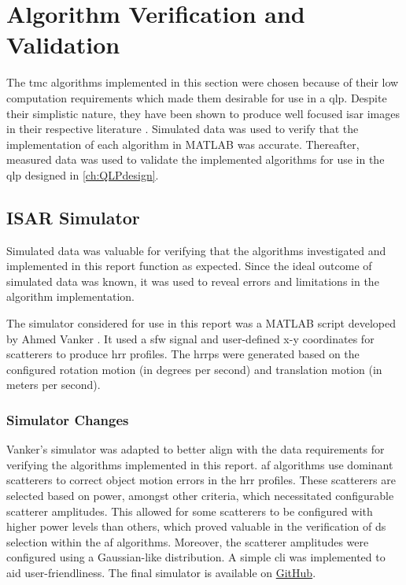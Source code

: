 \documentclass[class=report,11pt,crop=false]{standalone}
\begin{document}
\ifstandalone
\tableofcontents
\fi
\chapter{Algorithm Verification and Validation \label{ch:algorithmV&V}}
The \gls{tmc} algorithms implemented in this section were chosen because of their low computation requirements which made them desirable for use in a \gls{qlp}. Despite their simplistic nature, they have been shown to produce well focused \gls{isar} images in their respective literature \cite{ISARtextbook_Martorella,haywood_RA_AF,yuan_AF}. Simulated data was used to verify that the implementation of each algorithm in \textsc{MATLAB} was accurate. Thereafter, measured data was used to validate the implemented algorithms for use in the \gls{qlp} designed in \autoref{ch:QLPdesign}.
\section{ISAR Simulator}
Simulated data was valuable for verifying that the algorithms investigated and implemented in this report function as expected. Since the ideal outcome of simulated data was known, it was used to reveal errors and limitations in the algorithm implementation. 

The simulator considered for use in this report was a \textsc{MATLAB} script developed by Ahmed Vanker \cite{4022}. It used a \gls{sfw} signal and user-defined x-y coordinates for scatterers to produce \gls{hrr} profiles. The \gls{hrrp}s were generated based on the configured rotation motion (in degrees per second) and translation motion (in meters per second).

    \subsection{Simulator Changes}
     Vanker's simulator \cite{4022} was adapted to better align with the data requirements for verifying the algorithms implemented in this report. \gls{af} algorithms use dominant scatterers to correct object motion errors in the \gls{hrr} profiles. These scatterers are selected based on power, amongst other criteria, which necessitated configurable scatterer amplitudes. This allowed for some scatterers to be configured with higher power levels than others, which proved valuable in the verification of \gls{ds} selection within the \gls{af} algorithms. Moreover, the scatterer amplitudes were configured using a Gaussian-like distribution. A simple \gls{cli} was implemented to aid user-friendliness. The final simulator is available on \href{}{GitHub}.
\end{document}
